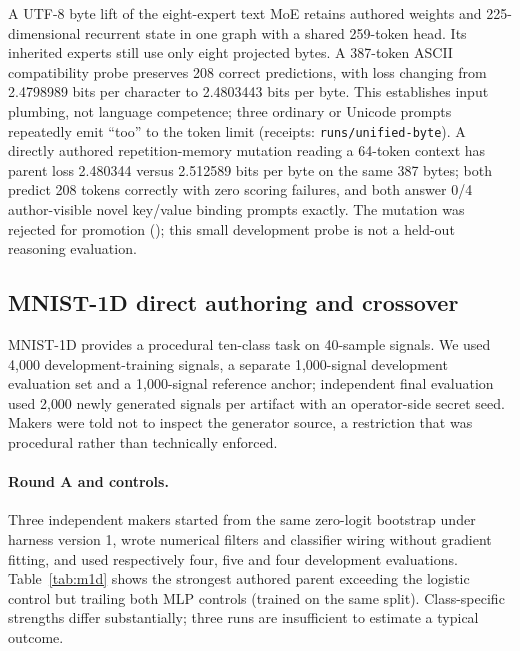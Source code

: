 \documentclass[11pt]{article}
\begin{document}
A UTF-8 byte lift of the eight-expert text MoE retains authored weights and 225-dimensional
recurrent state in one graph with a shared 259-token head. Its inherited experts still use only
eight projected bytes. A 387-token ASCII compatibility probe preserves 208 correct predictions,
with loss changing from 2.4798989 bits per character to 2.4803443 bits per byte. This
establishes input plumbing, not language competence; three ordinary or Unicode prompts
repeatedly emit ``too'' to the token limit (receipts: \texttt{runs/unified-byte}). A directly
authored repetition-memory mutation reading a 64-token context has parent loss 2.480344 versus
2.512589 bits per byte on the same 387 bytes; both predict 208 tokens correctly with zero scoring
failures, and both answer 0/4 author-visible novel key/value binding prompts exactly. The mutation
was rejected for promotion (); this small
development probe is not a held-out reasoning evaluation.

\subsection{MNIST-1D direct authoring and crossover}\label{sec:mnist1d}
MNIST-1D provides a procedural ten-class task on 40-sample signals. We used 4{,}000
development-training signals, a separate 1{,}000-signal development evaluation set and a
1{,}000-signal reference anchor; independent final evaluation used 2{,}000 newly generated
signals per artifact with an operator-side secret seed. Makers were told not to inspect the
generator source, a restriction that was procedural rather than technically enforced.

\paragraph{Round A and controls.} Three independent makers started from the same zero-logit
bootstrap under harness version 1, wrote numerical filters and classifier wiring without gradient
fitting, and used respectively four, five and four development evaluations.
Table~\ref{tab:m1d} shows the strongest authored parent exceeding the logistic control but
trailing both MLP controls (trained on the same split). Class-specific strengths differ
substantially; three runs are insufficient to estimate a typical outcome.
\end{document}
